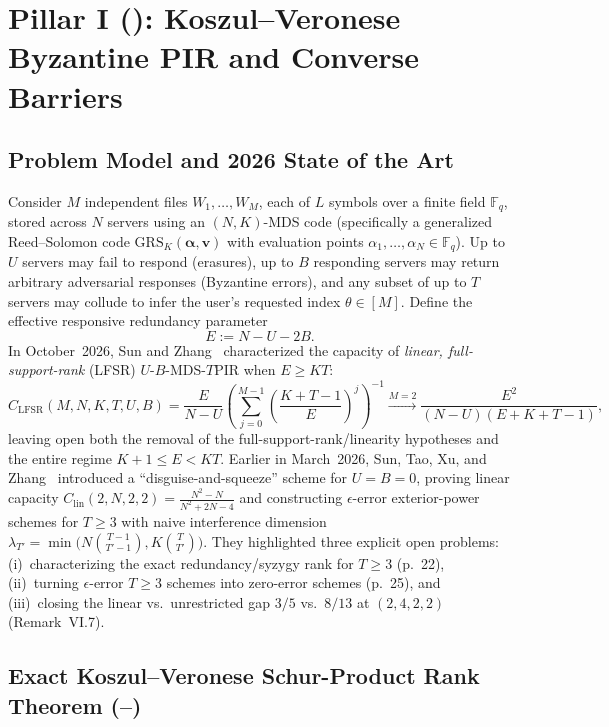 \documentclass[11pt,letterpaper]{amsart}
\DeclareRobustCommand{\texttt}[1]{\ifmmode\text{\upshape\ttfamily #1}\else{\upshape\ttfamily #1}\fi}
\theoremstyle{plain}
\theoremstyle{definition}
\newcommand{\F}{\mathbb{F}}
\newcommand{\GRS}{\mathrm{GRS}}
\begin{document}
\section{Pillar I (\texttt{CS-053}): Koszul--Veronese Byzantine PIR and Converse Barriers}
\label{sec:pir}

\subsection{Problem Model and 2026 State of the Art}
Consider $M$ independent files $W_1, \dots, W_M$, each of $L$ symbols over a finite field $\F_q$, stored across $N$ servers using an $(N, K)$-MDS code (specifically a generalized Reed--Solomon code $\GRS_K(\boldsymbol{\alpha}, \boldsymbol{v})$ with evaluation points $\alpha_1, \dots, \alpha_N \in \F_q$). Up to $U$ servers may fail to respond (erasures), up to $B$ responding servers may return arbitrary adversarial responses (Byzantine errors), and any subset of up to $T$ servers may collude to infer the user's requested index $\theta \in [M]$. Define the effective responsive redundancy parameter
\begin{equation}
  E := N - U - 2B.
\end{equation}
In October~2026, Sun and Zhang~\cite{SunZhang2026} characterized the capacity of \emph{linear, full-support-rank} (LFSR) $U$-$B$-MDS-$T$PIR when $E \ge KT$:
\begin{equation}
  \label{eq:lfsr}
  C_{\mathrm{LFSR}}(M,N,K,T,U,B)
  = \frac{E}{N-U}\left(\sum_{j=0}^{M-1}\left(\frac{K+T-1}{E}\right)^j\right)^{-1}
  \xrightarrow{M=2} \frac{E^2}{(N-U)(E + K + T - 1)},
\end{equation}
leaving open both the removal of the full-support-rank/linearity hypotheses and the entire regime $K+1 \le E < KT$. Earlier in March~2026, Sun, Tao, Xu, and Zhang~\cite{SunTaoXuZhang2026} introduced a ``disguise-and-squeeze'' scheme for $U = B = 0$, proving linear capacity $C_{\mathrm{lin}}(2,N,2,2) = \frac{N^2-N}{N^2+2N-4}$ and constructing $\epsilon$-error exterior-power schemes for $T \ge 3$ with naive interference dimension $\lambda_{T'} = \min\!\bigl(N\binom{T-1}{T'-1}, K\binom{T}{T'}\bigr)$. They highlighted three explicit open problems: (i)~characterizing the exact redundancy/syzygy rank for $T \ge 3$ (p.~22), (ii)~turning $\epsilon$-error $T \ge 3$ schemes into zero-error schemes (p.~25), and (iii)~closing the linear vs.\ unrestricted gap $3/5$ vs.\ $8/13$ at $(2,4,2,2)$ (Remark~VI.7).

\subsection{Exact Koszul--Veronese Schur-Product Rank Theorem (\texttt{T1a}--\texttt{T1b})}
\end{document}
